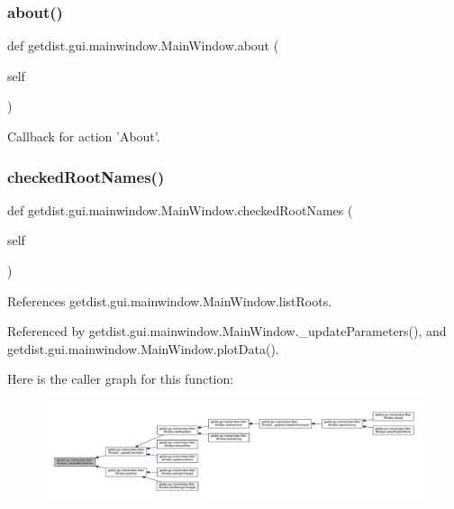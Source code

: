 \subsubsection{\texorpdfstring{about()}{about()}}
{\footnotesize\ttfamily def getdist.\+gui.\+mainwindow.\+Main\+Window.\+about (\begin{DoxyParamCaption}\item[{}]{self }\end{DoxyParamCaption})}

\begin{DoxyVerb}Callback for action 'About'.
\end{DoxyVerb}
 \mbox{\label{classgetdist_1_1gui_1_1mainwindow_1_1MainWindow_abdbfb43927d31864cd840b416d281df1}} 
\subsubsection{\texorpdfstring{checked\+Root\+Names()}{checkedRootNames()}}
{\footnotesize\ttfamily def getdist.\+gui.\+mainwindow.\+Main\+Window.\+checked\+Root\+Names (\begin{DoxyParamCaption}\item[{}]{self }\end{DoxyParamCaption})}



References getdist.\+gui.\+mainwindow.\+Main\+Window.\+list\+Roots.



Referenced by getdist.\+gui.\+mainwindow.\+Main\+Window.\+\_\+update\+Parameters(), and getdist.\+gui.\+mainwindow.\+Main\+Window.\+plot\+Data().

Here is the caller graph for this function\+:
\nopagebreak
\begin{figure}[H]
\begin{center}
\leavevmode
\includegraphics[width=350pt]{classgetdist_1_1gui_1_1mainwindow_1_1MainWindow_abdbfb43927d31864cd840b416d281df1_icgraph}
\end{center}
\end{figure}
\mbox{\label{classgetdist_1_1gui_1_1mainwindow_1_1MainWindow_a42a1bf08b1097561275a5910945b0b7f}} 

